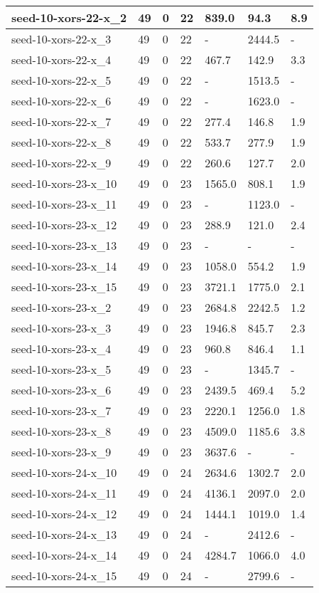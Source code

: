 \begin{scriptsize}
\begin{longtable}{|p{5cm}|l|l|l|l|l|l|}
seed-10-xors-22-x\_2&49&0&22&839.0&94.3&8.9 \\ \hline 
seed-10-xors-22-x\_3&49&0&22&-&2444.5&- \\ \hline 
seed-10-xors-22-x\_4&49&0&22&467.7&142.9&3.3 \\ \hline 
seed-10-xors-22-x\_5&49&0&22&-&1513.5&- \\ \hline 
seed-10-xors-22-x\_6&49&0&22&-&1623.0&- \\ \hline 
seed-10-xors-22-x\_7&49&0&22&277.4&146.8&1.9 \\ \hline 
seed-10-xors-22-x\_8&49&0&22&533.7&277.9&1.9 \\ \hline 
seed-10-xors-22-x\_9&49&0&22&260.6&127.7&2.0 \\ \hline 
seed-10-xors-23-x\_10&49&0&23&1565.0&808.1&1.9 \\ \hline 
seed-10-xors-23-x\_11&49&0&23&-&1123.0&- \\ \hline 
seed-10-xors-23-x\_12&49&0&23&288.9&121.0&2.4 \\ \hline 
seed-10-xors-23-x\_13&49&0&23&-&-&- \\ \hline 
seed-10-xors-23-x\_14&49&0&23&1058.0&554.2&1.9 \\ \hline 
seed-10-xors-23-x\_15&49&0&23&3721.1&1775.0&2.1 \\ \hline 
seed-10-xors-23-x\_2&49&0&23&2684.8&2242.5&1.2 \\ \hline 
seed-10-xors-23-x\_3&49&0&23&1946.8&845.7&2.3 \\ \hline 
seed-10-xors-23-x\_4&49&0&23&960.8&846.4&1.1 \\ \hline 
seed-10-xors-23-x\_5&49&0&23&-&1345.7&- \\ \hline 
seed-10-xors-23-x\_6&49&0&23&2439.5&469.4&5.2 \\ \hline 
seed-10-xors-23-x\_7&49&0&23&2220.1&1256.0&1.8 \\ \hline 
seed-10-xors-23-x\_8&49&0&23&4509.0&1185.6&3.8 \\ \hline 
seed-10-xors-23-x\_9&49&0&23&3637.6&-&- \\ \hline 
seed-10-xors-24-x\_10&49&0&24&2634.6&1302.7&2.0 \\ \hline 
seed-10-xors-24-x\_11&49&0&24&4136.1&2097.0&2.0 \\ \hline 
seed-10-xors-24-x\_12&49&0&24&1444.1&1019.0&1.4 \\ \hline 
seed-10-xors-24-x\_13&49&0&24&-&2412.6&- \\ \hline 
seed-10-xors-24-x\_14&49&0&24&4284.7&1066.0&4.0 \\ \hline 
seed-10-xors-24-x\_15&49&0&24&-&2799.6&- \\ \hline 

\end{longtable}
\end{scriptsize}
